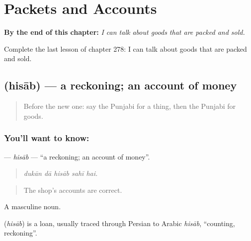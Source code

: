 
\chapter{Packets and Accounts}
\label{ch:pa-a2-packets-and-accounts}

\begin{chapteropening}
\textbf{By the end of this chapter:} \emph{I can talk about goods that are packed and sold.}

Complete the last lesson of chapter 278: I can talk about goods that are packed and sold.
\end{chapteropening}

\section[\texorpdfstring{\pa{ਹਿਸਾਬ} (hisāb)}{ਹਿਸਾਬ (hisāb)}]{ (hisāb) — a reckoning; an account of money}

\label{lesson:PA-C278-hisab}



\begin{quote}
Before the new one: say the Punjabi for a thing, then the Punjabi for goods.
\end{quote}

\subsection*{You'll want to know: }
\textbf{} — \emph{hisāb} — \textquotedblleft{}a reckoning; an account of money\textquotedblright{}.

\begin{quote}
    
\end{quote}

\begin{quote}
\emph{dukān dā hisāb sahī hai.}
\end{quote}

\begin{quote}
The shop's accounts are correct.
\end{quote}

A masculine noun.

\begin{cousinweb}
\textbf{} (\emph{hisāb}) is a loan, usually traced through Persian to Arabic \emph{hisāb}, \textquotedblleft{}counting, reckoning\textquotedblright{}.
\end{cousinweb}

